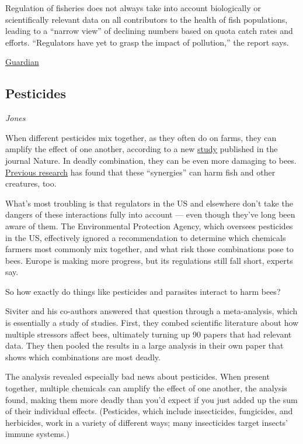 \documentclass[
]{book}
\begin{document}
Regulation of fisheries does not always take into account biologically or scientifically relevant data on all contributors to the health of fish populations, leading to a ``narrow view'' of declining numbers based on quota catch rates and efforts. ``Regulators have yet to grasp the impact of pollution,'' the report says.

\href{https://www.theguardian.com/environment/2021/apr/27/regulators-missing-pollutions-effect-on-marine-life-study-finds}{Guardian}

\hypertarget{pesticides}{%
\subsection{Pesticides}\label{pesticides}}

\emph{Jones}

When different pesticides mix together, as they often do on farms, they can amplify the effect of one another, according to a new \href{https://www.nature.com/articles/s41586-021-03787-7}{study} published in the journal Nature. In deadly combination, they can be even more damaging to bees. \href{https://www.fisheries.noaa.gov/feature-story/pesticide-mixtures-deadly-synergy-salmon}{Previous research} has found that these ``synergies'' can harm fish and other creatures, too.

What's most troubling is that regulators in the US and elsewhere don't take the dangers of these interactions fully into account --- even though they've long been aware of them. The Environmental Protection Agency, which oversees pesticides in the US, effectively ignored a recommendation to determine which chemicals farmers most commonly mix together, and what risk those combinations pose to bees. Europe is making more progress, but its regulations still fall short, experts say.

So how exactly do things like pesticides and parasites interact to harm bees?

Siviter and his co-authors answered that question through a meta-analysis, which is essentially a study of studies. First, they combed scientific literature about how multiple stressors affect bees, ultimately turning up 90 papers that had relevant data. They then pooled the results in a large analysis in their own paper that shows which combinations are most deadly.

The analysis revealed especially bad news about pesticides. When present together, multiple chemicals can amplify the effect of one another, the analysis found, making them more deadly than you'd expect if you just added up the sum of their individual effects. (Pesticides, which include insecticides, fungicides, and herbicides, work in a variety of different ways; many insecticides target insects' immune systems.)
\end{document}
